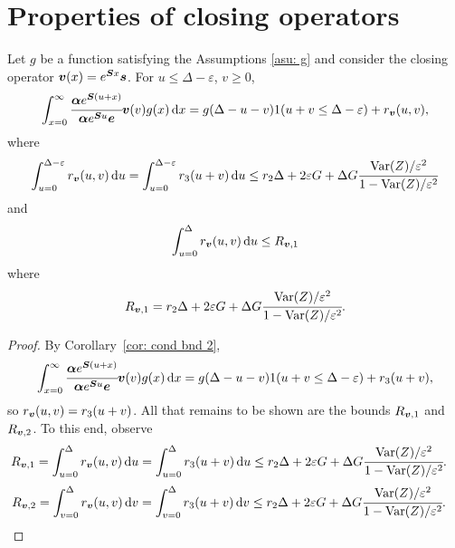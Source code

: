 \section{Properties of closing operators}\label{appendix: sec: 2}
\begin{cor}\label{cor: cond bnd 2 V}
	Let \(g\) be a function satisfying the Assumptions \ref{asu: g} and consider the closing operator \({\boldsymbol v}(x)=e^{\boldsymbol Sx}\boldsymbol s\). For \(u\leq \Delta-\varepsilon \), \(v\geq 0\), 
	\[\int_{x=0}^\infty \cfrac{\boldsymbol \alpha  e^{\boldsymbol{S} (u+x)} }{\boldsymbol \alpha  e^{\boldsymbol{S} u} \boldsymbol e} {\boldsymbol v}(v)g(x)\, \mathrm{d} x = g(\Delta-u-v) 1(u+v\leq\Delta-\varepsilon) + r_{\boldsymbol v} (u,v),\]
	where \[\displaystyle\int_{u=0}^{\Delta-\varepsilon}r_{\boldsymbol v}(u,v)\, \mathrm{d} u = \displaystyle\int_{u=0}^{\Delta-\varepsilon} r_3(u+v)\, \mathrm{d} u \leq r_2\Delta + 2\varepsilon G + \Delta G \cfrac{\mathrm{Var}(Z)/\varepsilon^2}{1-\mathrm{Var}(Z)/\varepsilon^2}\]
	and \[\int_{u=0}^\Delta r_{\boldsymbol v}(u,v) \, \mathrm{d} u\leq R_{{\boldsymbol v},1}\] where \[R_{{\boldsymbol v},1}=r_2\Delta + 2\varepsilon G + \Delta G \cfrac{\mathrm{Var}(Z)/\varepsilon^2}{1-\mathrm{Var}(Z)/\varepsilon^2}.\] 
\end{cor}
\begin{proof}
	By Corollary~\ref{cor: cond bnd 2}, 
	\[\int_{x=0}^\infty \cfrac{\boldsymbol \alpha  e^{\boldsymbol{S} (u+x)} }{\boldsymbol \alpha  e^{\boldsymbol{S} u} \boldsymbol e} {\boldsymbol v}(v)g(x)\, \mathrm{d} x = g(\Delta-u-v) 1(u+v\leq\Delta-\varepsilon) + r_3 (u+v),\]
	so \(r_{\boldsymbol v}(u,v)=r_3(u+v)\). All that remains to be shown are the bounds \(R_{{\boldsymbol v},1}\) and \(R_{{\boldsymbol v},2}\). To this end, observe 
	\begin{align*}
		R_{{\boldsymbol v},1}= \displaystyle\int_{u=0}^{\Delta}r_{\boldsymbol v}(u,v)\, \mathrm{d} u 
		 &= \displaystyle\int_{u=0}^{\Delta} r_3(u+v)\, \mathrm{d} u 
		 \leq r_2\Delta + 2\varepsilon G + \Delta G \cfrac{\mathrm{Var}(Z)/\varepsilon^2}{1-\mathrm{Var}(Z)/\varepsilon^2}.
	\end{align*}
	\begin{align*}
		 R_{{\boldsymbol v},2}= \displaystyle\int_{v=0}^{\Delta}r_{\boldsymbol v}(u,v)\, \mathrm{d} v 
		 &= \displaystyle\int_{v=0}^{\Delta} r_3(u+v)\, \mathrm{d} v 
		 \leq r_2\Delta + 2\varepsilon G + \Delta G \cfrac{\mathrm{Var}(Z)/\varepsilon^2}{1-\mathrm{Var}(Z)/\varepsilon^2}.
	\end{align*}
\end{proof}

